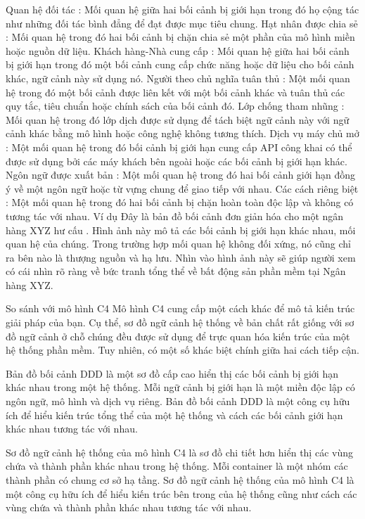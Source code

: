 Quan hệ đối tác : Mối quan hệ giữa hai bối cảnh bị giới hạn trong đó họ cộng tác như những đối tác bình đẳng để đạt được mục tiêu chung.
Hạt nhân được chia sẻ : Mối quan hệ trong đó hai bối cảnh bị chặn chia sẻ một phần của mô hình miền hoặc nguồn dữ liệu.
Khách hàng-Nhà cung cấp : Mối quan hệ giữa hai bối cảnh bị giới hạn trong đó một bối cảnh cung cấp chức năng hoặc dữ liệu cho bối cảnh khác, ngữ cảnh này sử dụng nó.
Người theo chủ nghĩa tuân thủ : Một mối quan hệ trong đó một bối cảnh được liên kết với một bối cảnh khác và tuân thủ các quy tắc, tiêu chuẩn hoặc chính sách của bối cảnh đó.
Lớp chống tham nhũng : Mối quan hệ trong đó lớp dịch được sử dụng để tách biệt ngữ cảnh này với ngữ cảnh khác bằng mô hình hoặc công nghệ không tương thích.
Dịch vụ máy chủ mở : Một mối quan hệ trong đó bối cảnh bị giới hạn cung cấp API công khai có thể được sử dụng bởi các máy khách bên ngoài hoặc các bối cảnh bị giới hạn khác.
Ngôn ngữ được xuất bản : Một mối quan hệ trong đó hai bối cảnh giới hạn đồng ý về một ngôn ngữ hoặc từ vựng chung để giao tiếp với nhau.
Các cách riêng biệt : Một mối quan hệ trong đó hai bối cảnh bị chặn hoàn toàn độc lập và không có tương tác với nhau.
Ví dụ
Đây là bản đồ bối cảnh đơn giản hóa cho một ngân hàng XYZ hư cấu . Hình ảnh này mô tả các bối cảnh bị giới hạn khác nhau, mối quan hệ của chúng. Trong trường hợp mối quan hệ không đối xứng, nó cũng chỉ ra bên nào là thượng nguồn và hạ lưu. Nhìn vào hình ảnh này sẽ giúp người xem có cái nhìn rõ ràng về bức tranh tổng thể về bất động sản phần mềm tại Ngân hàng XYZ.


So sánh với mô hình C4
Mô hình C4 cung cấp một cách khác để mô tả kiến ​​trúc giải pháp của bạn. Cụ thể, sơ đồ ngữ cảnh hệ thống về bản chất rất giống với sơ đồ ngữ cảnh ở chỗ chúng đều được sử dụng để trực quan hóa kiến ​​trúc của một hệ thống phần mềm. Tuy nhiên, có một số khác biệt chính giữa hai cách tiếp cận.

Bản đồ bối cảnh DDD là một sơ đồ cấp cao hiển thị các bối cảnh bị giới hạn khác nhau trong một hệ thống. Mỗi ngữ cảnh bị giới hạn là một miền độc lập có ngôn ngữ, mô hình và dịch vụ riêng. Bản đồ bối cảnh DDD là một công cụ hữu ích để hiểu kiến ​​trúc tổng thể của một hệ thống và cách các bối cảnh giới hạn khác nhau tương tác với nhau.

Sơ đồ ngữ cảnh hệ thống của mô hình C4 là sơ đồ chi tiết hơn hiển thị các vùng chứa và thành phần khác nhau trong hệ thống. Mỗi container là một nhóm các thành phần có chung cơ sở hạ tầng. Sơ đồ ngữ cảnh hệ thống của mô hình C4 là một công cụ hữu ích để hiểu kiến ​​trúc bên trong của hệ thống cũng như cách các vùng chứa và thành phần khác nhau tương tác với nhau.

